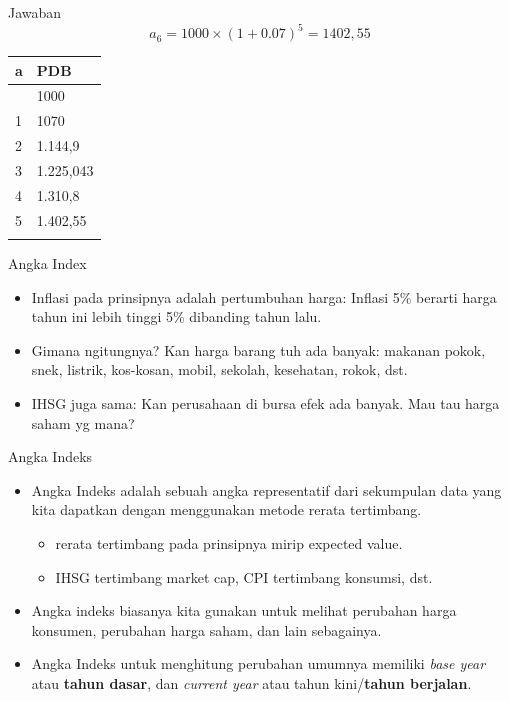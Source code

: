 \documentclass[
  ignorenonframetext,
]{beamer}
\begin{document}
\begin{frame}{Jawaban}
\label{jawaban-1}
\[a_6=1000 \times (1+0.07)^5=1402,55\]

\begin{longtable}[]{@{}ll@{}}
\toprule\noalign{}
a & PDB \\
\midrule\noalign{}
\endhead
0 & 1000 \\
1 & 1070 \\
2 & 1.144,9 \\
3 & 1.225,043 \\
4 & 1.310,8 \\
5 & 1.402,55 \\
\bottomrule\noalign{}
\end{longtable}
\end{frame}

\begin{frame}{Angka Index}
\label{angka-index}
\begin{itemize}
\item
  Inflasi pada prinsipnya adalah pertumbuhan harga: Inflasi 5\% berarti
  harga tahun ini lebih tinggi 5\% dibanding tahun lalu.
\item
  Gimana ngitungnya? Kan harga barang tuh ada banyak: makanan pokok,
  snek, listrik, kos-kosan, mobil, sekolah, kesehatan, rokok, dst.
\item
  IHSG juga sama: Kan perusahaan di bursa efek ada banyak. Mau tau harga
  saham yg mana?
\end{itemize}
\end{frame}

\begin{frame}{Angka Indeks}
\label{angka-indeks}
\begin{itemize}
\item
  Angka Indeks adalah sebuah angka representatif dari sekumpulan data
  yang kita dapatkan dengan menggunakan metode rerata tertimbang.

  \begin{itemize}
  \item
    rerata tertimbang pada prinsipnya mirip expected value.
  \item
    IHSG tertimbang market cap, CPI tertimbang konsumsi, dst.
  \end{itemize}
\item
  Angka indeks biasanya kita gunakan untuk melihat perubahan harga
  konsumen, perubahan harga saham, dan lain sebagainya.
\item
  Angka Indeks untuk menghitung perubahan umumnya memiliki \emph{base
  year} atau \textbf{tahun dasar}, dan \emph{current year} atau tahun
  kini/\textbf{tahun berjalan}.
\end{itemize}
\end{frame}
\end{document}
